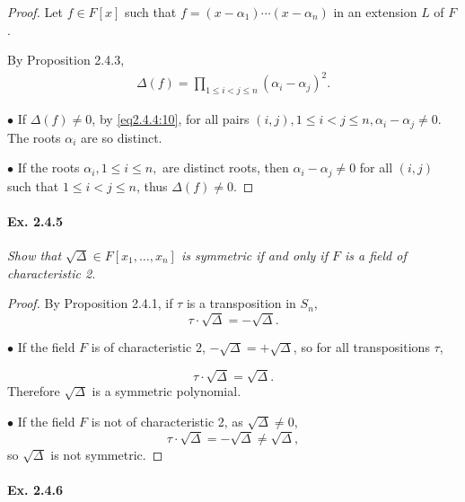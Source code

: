 \documentclass[11pt,a4paper]{article}
\begin{document}
\begin{proof}
Let $f \in F[x]$ such that $f = (x-\alpha_1)\cdots(x-\alpha_n)$ in an  extension $L$ of $F$.

By Proposition 2.4.3, 
\begin{align}
\Delta(f) = \prod_{1\leq i < j \leq n} (\alpha_i - \alpha_j)^2. \label{eq2.4.4:10}
\end{align}

$\bullet$ If $\Delta(f) \neq 0$, by \eqref{eq2.4.4:10}, for all pairs $(i,j), 1\leq i < j \leq n, \alpha_i - \alpha_j \neq 0$. The roots $\alpha_i$ are so distinct. 

$\bullet$ If the roots $\alpha_i,1 \leq i \leq n,$ are distinct roots, then $\alpha_i - \alpha_j \neq 0$ for all $(i,j)$ such that $1\leq i < j \leq n$, thus $\Delta(f) \neq 0$.

\end{proof}

\paragraph{Ex. 2.4.5}

{\it Show that $\sqrt{\Delta} \in F[x_1,\ldots,x_n]$ is symmetric if and only if $F$ is a field of characteristic 2.
}

\begin{proof}
By Proposition 2.4.1, if $\tau$ is a transposition in $S_n$,
$$\tau\cdot \sqrt{\Delta} =  - \sqrt{\Delta}.$$

$\bullet$ If the field $F$ is of characteristic 2, $- \sqrt{\Delta} = +  \sqrt{\Delta}$, so for all transpositions $\tau$,

$$\tau \cdot \sqrt{\Delta} =   \sqrt{\Delta}.$$
Therefore $\sqrt{\Delta} $ is a symmetric polynomial.

$\bullet$ If the field $F$ is not of characteristic 2, as $\sqrt{\Delta} \neq 0$,
$$\tau \cdot \sqrt{\Delta} =  - \sqrt{\Delta} \neq \sqrt{\Delta},$$
so $\sqrt{\Delta}$ is not symmetric.
\end{proof}

\paragraph{Ex. 2.4.6}
\end{document}
